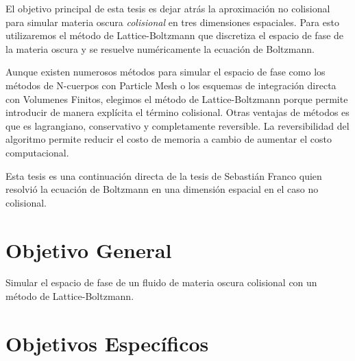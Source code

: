 \documentclass[12pt]{article}
\begin{document}
El objetivo principal de esta tesis es dejar atr\'as la aproximaci\'on
no colisional para simular materia oscura \emph{colisional} en tres
dimensiones espaciales.
Para esto utilizaremos el m\'etodo de Lattice-Boltzmann 
que  discretiza el espacio de fase de la materia oscura y se
resuelve numéricamente la ecuación de Boltzmann. 


Aunque existen numerosos métodos para simular el espacio de fase como
los métodos de N-cuerpos con Particle Mesh o los esquemas de
integración directa con Volumenes Finitos, elegimos el m\'etodo de
Lattice-Boltzmann porque permite introducir de manera expl\'icita el
t\'ermino colisional.
Otras ventajas de m\'etodos es que es lagrangiano,
conservativo y completamente reversible.\cite{integerLatticeDynamics}
La reversibilidad del algoritmo permite reducir el
costo de memoria a cambio de aumentar el costo computacional. 

Esta tesis es una continuaci\'on directa de la tesis de Sebasti\'an
Franco \cite{franco} quien resolvi\'o la ecuaci\'on de Boltzmann en
una dimensi\'on espacial en el caso no colisional.





\section{Objetivo General}


Simular el espacio de fase de un fluido de materia oscura colisional con un método de Lattice-Boltzmann.



\section{Objetivos Específicos}
\end{document}
